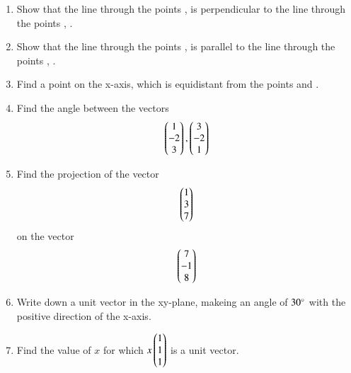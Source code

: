 \begin{enumerate}[label=\arabic*.,ref=\thesubsection.\theenumi]
\item Show that the line through the points ,  is perpendicular to the line through the points   , .
\\
\solution 

\item Show that the line through the points ,  is parallel to the line through the points   , .
\item Find a point on the x-axis, which is equidistant from the points  and .
\item Find the angle between the vectors 
\begin{align}
\begin{pmatrix}1\\-2\\3\end{pmatrix},
\begin{pmatrix}3\\-2\\1\end{pmatrix}
\end{align}
\item Find the projection of the vector 
\begin{align}
\begin{pmatrix}1\\3\\7\end{pmatrix}
\end{align}
on the vector
\begin{align}
\begin{pmatrix}7\\-1\\8\end{pmatrix}
\end{align}
\item Write down a unit vector in the xy-plane, makeing an angle of $30\degree$ with the positive direction of the x-axis.
\item Find the value of $x$ for which $x\begin{pmatrix}1\\1\\1\end{pmatrix}$ is a unit vector.

\end{enumerate}

